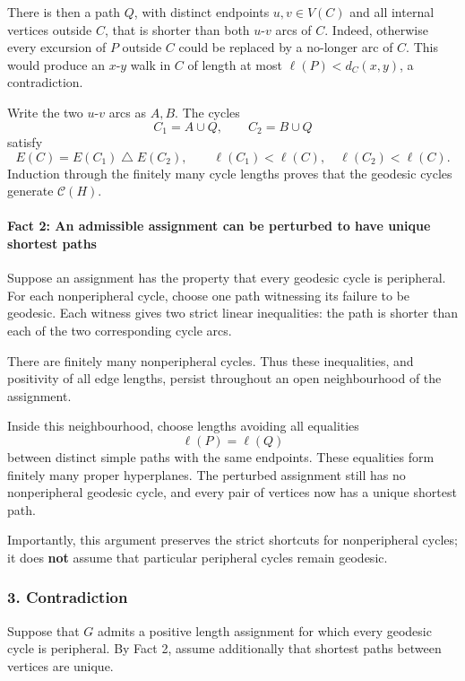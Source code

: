 \documentclass[
  11pt,
  a4paper,
]{article}
\begin{document}
There is then a path \(Q\), with distinct endpoints \(u,v\in V(C)\) and
all internal vertices outside \(C\), that is shorter than both
\(u\)-\(v\) arcs of \(C\). Indeed, otherwise every excursion of \(P\)
outside \(C\) could be replaced by a no-longer arc of \(C\). This would
produce an \(x\)-\(y\) walk in \(C\) of length at most
\(\ell(P)<d_C(x,y)\), a contradiction.

Write the two \(u\)-\(v\) arcs as \(A,B\). The cycles \[
C_1=A\cup Q,\qquad C_2=B\cup Q
\] satisfy \[
E(C)=E(C_1)\mathbin{\triangle}E(C_2),
\qquad
\ell(C_1)<\ell(C),\quad \ell(C_2)<\ell(C).
\] Induction through the finitely many cycle lengths proves that the
geodesic cycles generate \(\mathcal C(H)\).

\paragraph{Fact 2: An admissible assignment can be perturbed to have
unique shortest
paths}\label{fact-2-an-admissible-assignment-can-be-perturbed-to-have-unique-shortest-paths}

Suppose an assignment has the property that every geodesic cycle is
peripheral. For each nonperipheral cycle, choose one path witnessing its
failure to be geodesic. Each witness gives two strict linear
inequalities: the path is shorter than each of the two corresponding
cycle arcs.

There are finitely many nonperipheral cycles. Thus these inequalities,
and positivity of all edge lengths, persist throughout an open
neighbourhood of the assignment.

Inside this neighbourhood, choose lengths avoiding all equalities \[
\ell(P)=\ell(Q)
\] between distinct simple paths with the same endpoints. These
equalities form finitely many proper hyperplanes. The perturbed
assignment still has no nonperipheral geodesic cycle, and every pair of
vertices now has a unique shortest path.

Importantly, this argument preserves the strict shortcuts for
nonperipheral cycles; it does \textbf{not} assume that particular
peripheral cycles remain geodesic.

\subsubsection{3. Contradiction}\label{contradiction}

Suppose that \(G\) admits a positive length assignment for which every
geodesic cycle is peripheral. By Fact 2, assume additionally that
shortest paths between vertices are unique.
\end{document}
